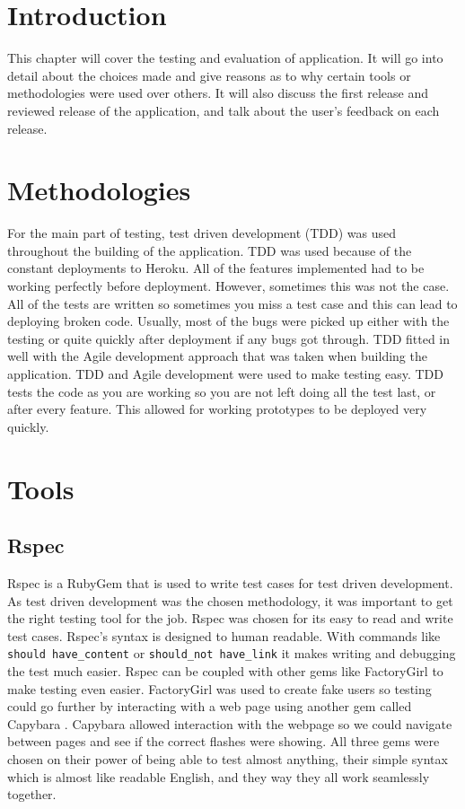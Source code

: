 \section{Introduction}
This chapter will cover the testing and evaluation of application. It will go into detail about the choices made and give reasons as to why certain tools or methodologies were used over others. It will also discuss the first release and reviewed release of the application, and talk about the user's feedback on each release.\\

\section{Methodologies}
For the main part of testing, test driven development (TDD)  was used throughout the building of the application. TDD was used because of the constant deployments to Heroku. All of the features implemented had to be working perfectly before deployment. However, sometimes this was not the case. All of the tests are written so sometimes you miss a test case and this can lead to deploying broken code. Usually, most of the bugs were picked up either with the testing or quite quickly after deployment if any bugs got through. TDD fitted in well with the Agile development approach that was taken when building the application. TDD and Agile development were used to make testing easy. TDD tests the code as you are working so you are not left doing all the test last, or after every feature. This allowed for working prototypes to be deployed very quickly.\\

\section{Tools}
\subsection{Rspec}
Rspec is a RubyGem that is used to write test cases for test driven development. As test driven development was the chosen methodology, it was important to get the right testing tool for the job. Rspec was chosen for its easy to read and write test cases. Rspec's syntax is designed to human readable. With commands like \lstinline{should have_content} or \lstinline{should_not have_link} it makes writing and debugging the test much easier. Rspec can be coupled with other gems like FactoryGirl to make testing even easier. FactoryGirl \citep{factorygirl:2013} was used to create fake users so testing could go further by interacting with a web page using another gem called Capybara \citep{capybara:2013}. Capybara allowed interaction with the webpage so we could navigate between pages and see if the correct flashes were showing. All three gems were chosen on their power of being able to test almost anything, their simple syntax which is almost like readable English, and they way they all work seamlessly together.

